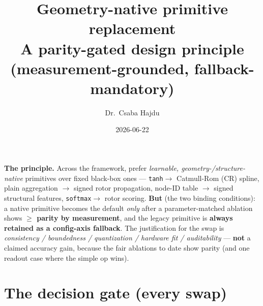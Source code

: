 \documentclass[11pt]{article}
\title{\textbf{Geometry-native primitive replacement}\\[2pt]
  \large A parity-gated design principle (measurement-grounded, fallback-mandatory)}
\author{Dr.\ Csaba Hajdu}
\date{2026-06-22}
\newcommand{\code}[1]{\texttt{\small #1}}
\begin{document}
\maketitle

\noindent\textbf{The principle.} Across the framework, prefer \emph{learnable, geometry-/structure-native}
primitives over fixed black-box ones --- \code{tanh}$\to$ Catmull-Rom (CR) spline, plain aggregation $\to$
signed rotor propagation, node-ID table $\to$ signed structural features, \code{softmax}$\to$ rotor scoring.
\textbf{But} (the two binding conditions): a native primitive becomes the default \emph{only} after a
parameter-matched ablation shows \textbf{$\ge$ parity by measurement}, and the legacy primitive is \textbf{always
retained as a config-axis fallback}. The justification for the swap is \emph{consistency / boundedness /
quantization / hardware fit / auditability} --- \textbf{not} a claimed accuracy gain, because the fair ablations
to date show parity (and one readout case where the simple op wins).

\section*{The decision gate (every swap)}
\begin{center}
\end{center}
\end{document}
